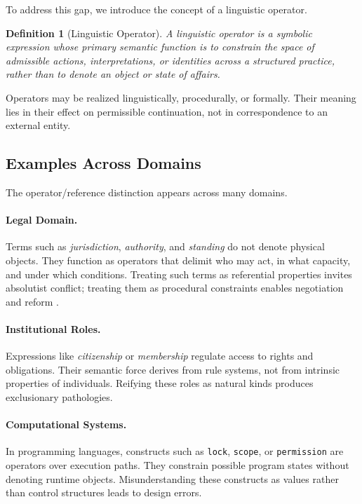 \documentclass[11pt]{article}
\newtheorem{definition}{Definition}
\begin{document}
To address this gap, we introduce the concept of a linguistic operator.

\begin{definition}[Linguistic Operator]
A linguistic operator is a symbolic expression whose primary semantic function is
to constrain the space of admissible actions, interpretations, or identities
across a structured practice, rather than to denote an object or state of affairs.
\end{definition}

Operators may be realized linguistically, procedurally, or formally. Their
meaning lies in their effect on permissible continuation, not in correspondence
to an external entity.

\subsection{Examples Across Domains}

The operator/reference distinction appears across many domains.

\paragraph{Legal Domain.}
Terms such as \emph{jurisdiction}, \emph{authority}, and \emph{standing} do not
denote physical objects. They function as operators that delimit who may act, in
what capacity, and under which conditions. Treating such terms as referential
properties invites absolutist conflict; treating them as procedural constraints
enables negotiation and reform \cite{hart1961}.

\paragraph{Institutional Roles.}
Expressions like \emph{citizenship} or \emph{membership} regulate access to rights
and obligations. Their semantic force derives from rule systems, not from
intrinsic properties of individuals. Reifying these roles as natural kinds
produces exclusionary pathologies.

\paragraph{Computational Systems.}
In programming languages, constructs such as \texttt{lock}, \texttt{scope}, or
\texttt{permission} are operators over execution paths. They constrain possible
program states without denoting runtime objects. Misunderstanding these
constructs as values rather than control structures leads to design errors.
\end{document}
